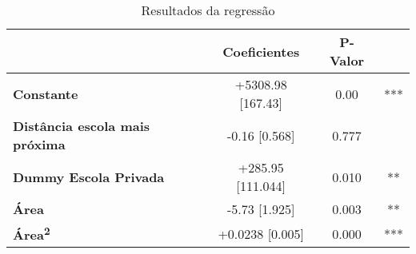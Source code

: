 
\begin{table}[h]
    \centering
    \begin{tabular}{lccc}
        \hline
        & \textbf{Coeficientes} & \textbf{P-Valor} & \\
        \hline
        \textbf{Constante} & +5308.98 [167.43] & 0.00 & *** \\
        \textbf{Distância escola mais próxima} & -0.16 [0.568] & 0.777 &  \\
        \textbf{Dummy Escola Privada} & +285.95 [111.044] & 0.010 & ** \\
        \textbf{Área} & -5.73 [1.925] & 0.003 & ** \\
        \textbf{Área\textsuperscript{2}} & +0.0238 [0.005] & 0.000 & *** \\
        \hline
    \end{tabular}
    \caption{Resultados da regressão}
    \label{tab:regressao}
\end{table}
